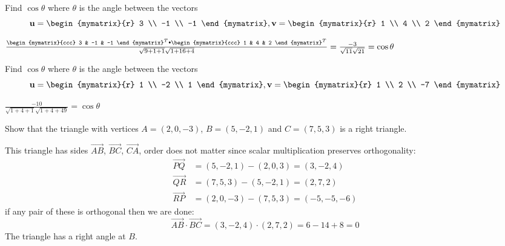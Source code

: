 \begin{enumialphparenastyle}

\begin{ex} Find $\cos \theta$ where $\theta$ is the angle between the vectors 
\begin{equation*}
\vect{u}
=
\begin{mymatrix}{r}
3 \\
-1 \\
-1
\end{mymatrix},
\vect{v}
=
\begin{mymatrix}{r}
1 \\
4 \\
2
\end{mymatrix}
\end{equation*}
\begin{sol}
 $\frac{\begin{mymatrix}{ccc} 
3 & -1 & -1
\end{mymatrix}^T \dotprod
\begin{mymatrix}{ccc}
1 & 4 & 2
\end{mymatrix}^T }{\sqrt{9+1+1}\sqrt{1+16+4}}= \frac{-3}{\sqrt{11}\sqrt{21}}= \cos \theta $ 
\end{sol}
\end{ex}

\begin{ex} Find $\cos \theta$ where $\theta$ is the angle between the vectors  
\begin{equation*}
\vect{u}
=
\begin{mymatrix}{r}
1 \\
-2 \\
1
\end{mymatrix},
\vect{v}
=
\begin{mymatrix}{r}
1 \\
2 \\
-7
\end{mymatrix}
\end{equation*}
\begin{sol}
 $\frac{-10}{\sqrt{1+4+1}\sqrt{1+4+49}}=\cos \theta $ 

\end{sol}
\end{ex}

\begin{ex} Show that the triangle with vertices $A=(2,0,-3)$, $B=(5,-2,1)$ and $C=(7,5,3)$ is a right triangle. 
\begin{sol}

This triangle has sides $\overrightarrow{AB}$, $\overrightarrow{BC}$, $\overrightarrow{CA}$, order does not matter since scalar multiplication preserves orthogonality:
\begin{align*}
\overrightarrow{PQ}&=(5,-2,1)-(2,0,3)=(3,-2,4)\\
\overrightarrow{QR}&=(7,5,3)-(5,-2,1)=(2,7,2)\\
\overrightarrow{RP}&=(2,0,-3)-(7,5,3)=(-5,-5,-6)
\end{align*}
if any pair of these is orthogonal then we are done:
$$\overrightarrow{AB}\cdot\overrightarrow{BC}=(3,-2,4)\cdot (2,7,2)=6-14+8=0$$
The triangle has a right angle at $B$.



\end{sol}
\end{ex}
\end{enumialphparenastyle}

